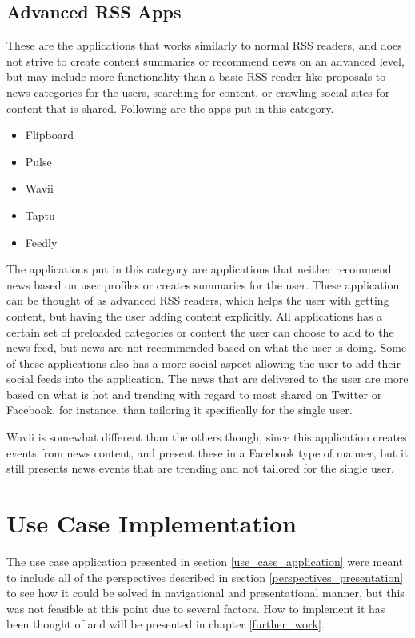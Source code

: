 \subsection{Advanced RSS Apps}
These are the applications that works similarly to normal RSS readers, and does not strive to create content summaries or recommend news on an advanced level, but may include more functionality than a basic RSS reader like proposals to news categories for the users, searching for content, or crawling social sites for content that is shared. Following are the apps put in this category.

\begin{itemize}
	\item Flipboard
	\item Pulse
	\item Wavii
	\item Taptu
	\item Feedly
\end{itemize}

The applications put in this category are applications that neither recommend news based on user profiles or creates summaries for the user. These application can be thought of as advanced RSS readers, which helps the user with getting content, but having the user adding content explicitly. All applications has a certain set of preloaded categories or content the user can choose to add to the news feed, but news are not recommended based on what the user is doing. Some of these applications also has a more social aspect allowing the user to add their social feeds into the application. The news that are delivered to the user are more based on what is hot and trending with regard to most shared on Twitter or Facebook, for instance, than tailoring it specifically for the single user. 

Wavii is somewhat different than the others though, since this application creates events from news content, and present these in a Facebook type of manner, but it still presents news events that are trending and not tailored for the single user.

\section{Use Case Implementation}
The use case application presented in section \ref{use_case_application} were meant to include all of the perspectives described in section \ref{perspectives_presentation} to see how it could be solved in navigational and presentational manner, but this was not feasible at this point due to several factors. How to implement it has been thought of and will be presented in chapter \ref{further_work}.


